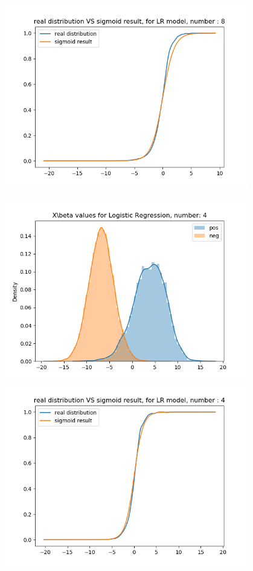 \documentclass{article}
\begin{document}
\begin{figure}[H]
\begin{minipage}{0.19\textwidth}
        \includegraphics[width=0.95\textwidth]{fig/lr/8-2.png}
    \end{minipage}
    \begin{minipage}{0.19\textwidth}
        \centering
        \includegraphics[width=0.95\textwidth]{fig/lr/4.png}
        \includegraphics[width=0.95\textwidth]{fig/lr/4-2.png}

\end{minipage}
\end{figure}
\end{document}
